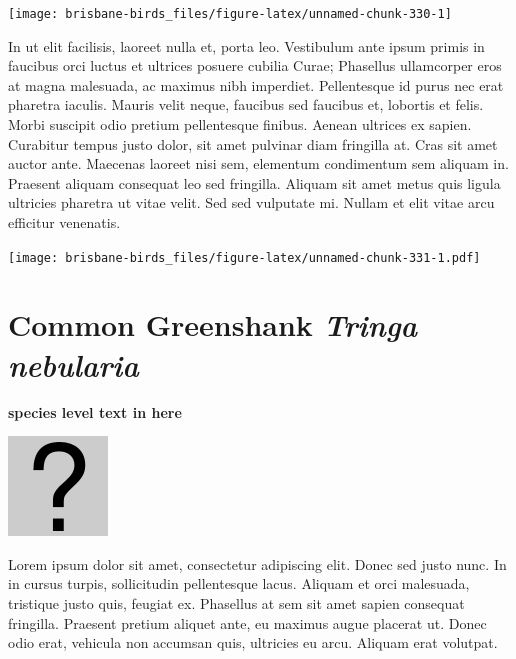 \documentclass[]{book}
\let\origfigure\figure
\let\endorigfigure\endfigure
\renewenvironment{figure}[1][2] {
  \expandafter\origfigure\expandafter[H]
} {
  \endorigfigure
}
\begin{document}
\begin{figure}
\texttt{[image: brisbane-birds\_files/figure-latex/unnamed-chunk-330-1]} \caption{insert figure caption}\label{fig:unnamed-chunk-330}
\end{figure}

In ut elit facilisis, laoreet nulla et, porta leo. Vestibulum ante ipsum
primis in faucibus orci luctus et ultrices posuere cubilia Curae;
Phasellus ullamcorper eros at magna malesuada, ac maximus nibh
imperdiet. Pellentesque id purus nec erat pharetra iaculis. Mauris velit
neque, faucibus sed faucibus et, lobortis et felis. Morbi suscipit odio
pretium pellentesque finibus. Aenean ultrices ex sapien. Curabitur
tempus justo dolor, sit amet pulvinar diam fringilla at. Cras sit amet
auctor ante. Maecenas laoreet nisi sem, elementum condimentum sem
aliquam in. Praesent aliquam consequat leo sed fringilla. Aliquam sit
amet metus quis ligula ultricies pharetra ut vitae velit. Sed sed
vulputate mi. Nullam et elit vitae arcu efficitur venenatis.

\begin{figure}
\centering
\texttt{[image: brisbane-birds\_files/figure-latex/unnamed-chunk-331-1.pdf]}
\caption{\label{fig:unnamed-chunk-331}insert figure caption}
\end{figure}

\section{\texorpdfstring{Common Greenshank \emph{Tringa
nebularia}}{Common Greenshank Tringa nebularia}}\label{common-greenshank-tringa-nebularia}

\textbf{species level text in here}

\begin{figure}
\centering
\includegraphics{assets/missing.png}
\caption{No image for species}
\end{figure}

Lorem ipsum dolor sit amet, consectetur adipiscing elit. Donec sed justo
nunc. In in cursus turpis, sollicitudin pellentesque lacus. Aliquam et
orci malesuada, tristique justo quis, feugiat ex. Phasellus at sem sit
amet sapien consequat fringilla. Praesent pretium aliquet ante, eu
maximus augue placerat ut. Donec odio erat, vehicula non accumsan quis,
ultricies eu arcu. Aliquam erat volutpat.
\end{document}

